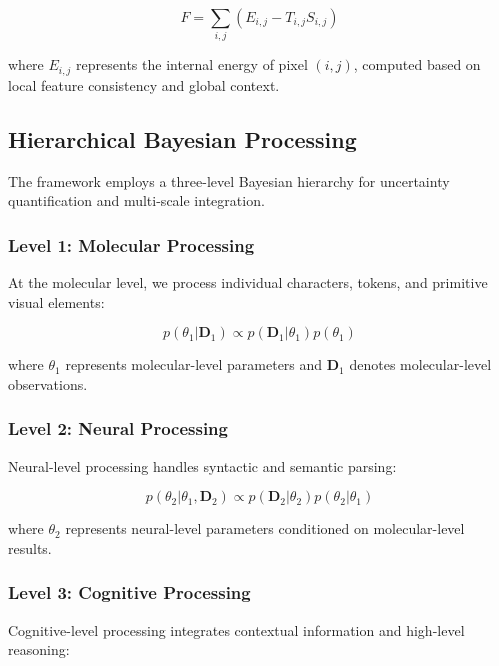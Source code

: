 \documentclass[12pt,a4paper]{article}
\begin{document}
\begin{equation}
F = \sum_{i,j} \left( E_{i,j} - T_{i,j} S_{i,j} \right)
\end{equation}

where $E_{i,j}$ represents the internal energy of pixel $(i,j)$, computed based on local feature consistency and global context.

\subsection{Hierarchical Bayesian Processing}

The framework employs a three-level Bayesian hierarchy for uncertainty quantification and multi-scale integration.

\subsubsection{Level 1: Molecular Processing}

At the molecular level, we process individual characters, tokens, and primitive visual elements:

\begin{equation}
p(\theta_1 | \mathbf{D}_1) \propto p(\mathbf{D}_1 | \theta_1) p(\theta_1)
\end{equation}

where $\theta_1$ represents molecular-level parameters and $\mathbf{D}_1$ denotes molecular-level observations.

\subsubsection{Level 2: Neural Processing}

Neural-level processing handles syntactic and semantic parsing:

\begin{equation}
p(\theta_2 | \theta_1, \mathbf{D}_2) \propto p(\mathbf{D}_2 | \theta_2) p(\theta_2 | \theta_1)
\end{equation}

where $\theta_2$ represents neural-level parameters conditioned on molecular-level results.

\subsubsection{Level 3: Cognitive Processing}

Cognitive-level processing integrates contextual information and high-level reasoning:
\end{document}
